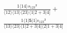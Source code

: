 \documentclass[varwidth, border=5pt]{standalone}
\begin{document}
\begin{my}
$\begin{gathered}
\scriptscriptstyle\frac{1⟨14⟩s_{123}²}{⟨12⟩⟨13⟩⟨23⟩⟨1|2+3|4]} +\\
\scriptscriptstyle\frac{1⟨1|𝟓|1]s_{123}²}{⟨13⟩⟨23⟩⟨1|2+3|4]⟨2|1+3|4]} \phantom{+}
\end{gathered}$
\end{my}
\end{document}
